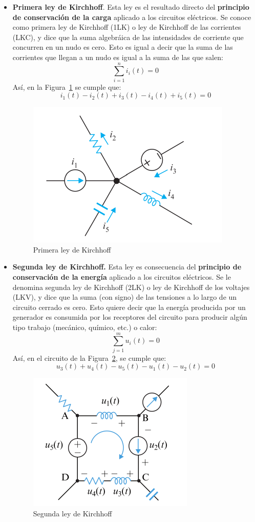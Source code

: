 \documentclass[11pt]{book} %
\numberwithin{dummy}{section}
\theoremstyle{ocrenumbox}
\theoremstyle{blacknumex}
\theoremstyle{blacknumbox}
\theoremstyle{ocrenum}
\begin{document}
	\begin{itemize}
		\item \textbf{Primera ley de Kirchhoff}. Esta ley es el resultado directo del \textbf{principio de conservación de la carga} aplicado a los circuitos eléctricos. Se conoce como primera ley de Kirchhoff (1LK) o ley de Kirchhoff de las corrientes (LKC), y dice que la suma algebráica de las intensidades de corriente que concurren en un nudo es cero. Esto es igual a decir que la suma de las corrientes que llegan a un nudo es igual a la suma de las que salen: 
		\begin{equation}
			\boxed{\sum_{i=1}^n i_i(t)=0}
		\end{equation}
		Así, en la Figura~\ref{fig.LKC_FM} se cumple que:
		\begin{equation*}
			i_1(t) - i_2(t) + i_3(t) - i_4(t) + i_5(t) = 0
		\end{equation*}
		
		\begin{figure}[htbp]
			\centering
			\includegraphics[width=0.35\linewidth]{../figs/LKC_FM.pdf}
			\caption{Primera ley de Kirchhoff}
			\label{fig.LKC_FM}
		\end{figure}
		\item \textbf{Segunda ley de Kirchhoff.} Esta ley es consecuencia del \textbf{principio de conservación de la energía} aplicado a los circuitos eléctricos. Se le
		denomina segunda ley de Kirchhoff (2LK) o ley de Kirchhoff de los voltajes (LKV), y dice que la suma (con signo) de las tensiones a lo largo de un circuito cerrado es cero. Esto quiere decir que la energía producida por un generador es consumida por los receptores del circuito
		para producir algún tipo trabajo (mecánico, químico, etc.) o calor:
		\begin{equation}
			\boxed{\sum_{j=1}^m u_i(t)=0}
		\end{equation}
		Así, en el circuito de la Figura~\ref{fig.LKV_FM}, se cumple que:
		\begin{equation*}
			u_3(t) + u_4 (t) - u_5 (t) - u_1 (t) - u_2 (t)  = 0 
		\end{equation*}
		\begin{figure}[htbp]
			\centering
			\includegraphics[width=0.35\linewidth]{../figs/LKV_FM.pdf}
			\caption{Segunda ley de Kirchhoff}
			\label{fig.LKV_FM}
		\end{figure}
	\end{itemize}
	
\end{document}
